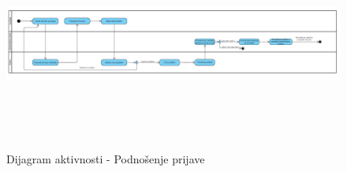 \begin{figure}[H]
  \begin{center}
      \includegraphics[width=140mm, height=70mm]{Diagrams/dijagram_aktivnosti_podnosenje_prijave.png}
  \end{center}
  \caption {Dijagram aktivnosti - Podnošenje prijave}
  \label{activity_podnosenje_prijave}

\end{figure}



